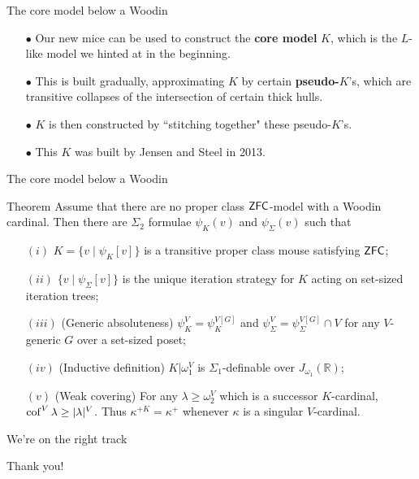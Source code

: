 \begin{frame}{The core model below a Woodin}
\begin{itemize}
\pause\item[$\bullet$] Our new mice can be used to construct the \textbf{core model} $K$, which is the $L$-like model we hinted at in the beginning.
\pause\item[$\bullet$] This is built gradually, approximating $K$ by certain \textbf{pseudo-$K$}'s, which are {\color{brown}transitive collapses} of the intersection of certain {\color{cyan}thick hulls}.
\pause\item[$\bullet$] $K$ is then constructed by ``stitching together" these pseudo-$K$'s.
\pause\item[$\bullet$] This $K$ was built by Jensen and Steel in 2013.
\end{itemize}
\end{frame}

\begin{frame}{The core model below a Woodin}
\begin{block}{Theorem}
Assume that there are no proper class $\operatorname{\mathsf{ZFC}}$-model with a {\color{olive}Woodin cardinal}. Then there are $\Sigma_2$ formulae $\psi_K(v)$ and $\psi_{\Sigma}(v)$ such that
\begin{itemize}
\item[$(i)$] $K=\{v\mid\psi_K[v]\}$ is a transitive proper class mouse satisfying $\operatorname{\mathsf{ZFC}}$;
\item[$(ii)$] $\{v\mid\psi_{\Sigma}[v]\}$ is the unique iteration strategy for $K$ acting on set-sized iteration trees;
\item[$(iii)$] (Generic absoluteness) $\psi_K^V=\psi_K^{V[G]}$ and $\psi_{\Sigma}^V=\psi_{\Sigma}^{V[G]}\cap V$ for any $V$-generic $G$ over a set-sized poset;
\item[$(iv)$] (Inductive definition) $K|\omega_1^V$ is $\Sigma_1$-definable over $J_{\omega_1}(\mathbb R)$;
\item[$(v)$] (Weak covering) For any $\lambda\geq\omega_2^V$ which is a successor $K$-cardinal, $\operatorname{cof}^V\lambda\geq|\lambda|^V$. Thus $\kappa^{+K}=\kappa^+$ whenever $\kappa$ is a singular $V$-cardinal.
\end{itemize}
\end{block}
\end{frame}

\begin{frame}{We're on the right track}
\begin{center}
\end{center}
\end{frame}

\begin{frame}
\begin{center}
\Large Thank you!
\end{center}
\end{frame}


